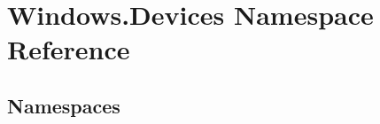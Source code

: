 \hypertarget{namespace_windows_1_1_devices}{}\section{Windows.\+Devices Namespace Reference}
\label{namespace_windows_1_1_devices}
\subsection*{Namespaces}
\begin{DoxyCompactItemize}
\end{DoxyCompactItemize}
